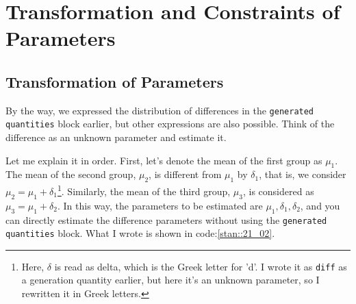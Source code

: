 \documentclass{ltjsbook}
\begin{document}
\section{Transformation and Constraints of Parameters}
\subsection{Transformation of Parameters}
By the way, we expressed the distribution of differences in the \verb|generated quantities| block earlier, but other expressions are also possible. Think of the difference as an unknown parameter and estimate it.

Let me explain it in order. First, let's denote the mean of the first group as $\mu_1$. The mean of the second group, $\mu_2$, is different from $\mu_1$ by $\delta_1$, that is, we consider $\mu_2=\mu_1+\delta_1$\footnote{Here, $\delta$ is read as delta, which is the Greek letter for 'd'. I wrote it as \verb|diff| as a generation quantity earlier, but here it's an unknown parameter, so I rewritten it in Greek letters.}. Similarly, the mean of the third group, $\mu_3$, is considered as $\mu_3 = \mu_1+\delta_2$. In this way, the parameters to be estimated are $\mu_1,\delta_1,\delta_2$, and you can directly estimate the difference parameters without using the \verb|generated quantities| block. What I wrote is shown in code:\ref{stan::21_02}.


\end{document}
